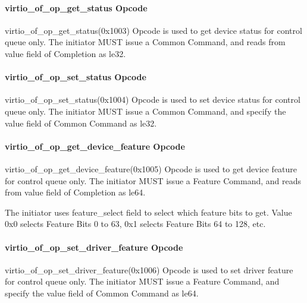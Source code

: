 \paragraph{virtio_of_op_get_status Opcode}\label{sec:Virtio Transport Options / Virtio Over Fabrics / Transmition Protocol / Opcodes Definition / virtio_of_op_get_status Opcode}

virtio_of_op_get_status(0x1003) Opcode is used to get device status for control queue only. The initiator MUST issue a Common Command, and reads from value field of Completion as le32.

\paragraph{virtio_of_op_set_status Opcode}\label{sec:Virtio Transport Options / Virtio Over Fabrics / Transmition Protocol / Opcodes Definition / virtio_of_op_set_status Opcode}

virtio_of_op_set_status(0x1004) Opcode is used to set device status for control queue only. The initiator MUST issue a Common Command, and specify the value field of Common Command as le32.

\paragraph{virtio_of_op_get_device_feature Opcode}\label{sec:Virtio Transport Options / Virtio Over Fabrics / Transmition Protocol / Opcodes Definition / virtio_of_op_get_device_feature Opcode}

virtio_of_op_get_device_feature(0x1005) Opcode is used to get device feature for control queue only. The initiator MUST issue a Feature Command, and reads from value field of Completion as le64.

The initiator uses feature_select field to select which feature bits to get. Value 0x0 selects Feature Bits 0 to 63, 0x1 selects Feature Bits 64 to 128, etc.

\paragraph{virtio_of_op_set_driver_feature Opcode}\label{sec:Virtio Transport Options / Virtio Over Fabrics / Transmition Protocol / Opcodes Definition / virtio_of_op_set_driver_feature Opcode}

virtio_of_op_set_driver_feature(0x1006) Opcode is used to set driver feature for control queue only. The initiator MUST issue a Feature Command, and specify the value field of Common Command as le64.

